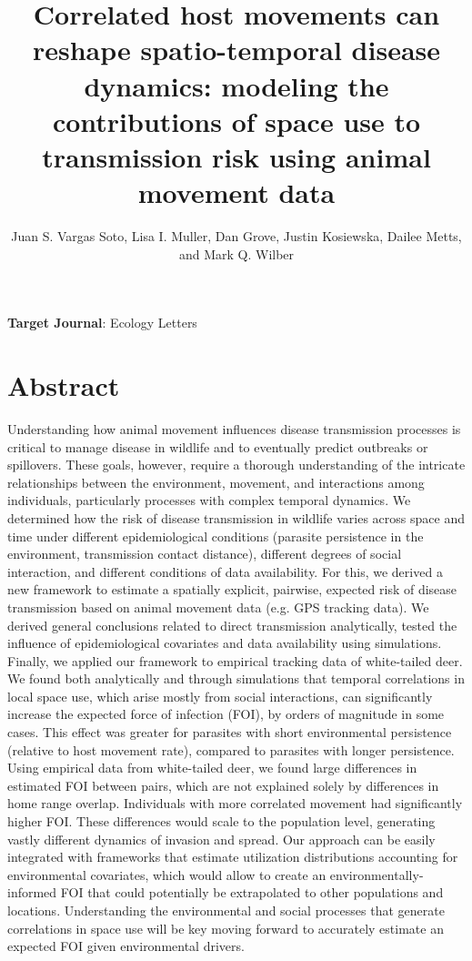 \documentclass[letterpaper]{article}
\title{Correlated host movements can reshape spatio-temporal disease dynamics: modeling the contributions of space use to transmission risk using animal movement data}
\author{Juan S. Vargas Soto, Lisa I. Muller, Dan Grove, Justin Kosiewska, Dailee Metts, and Mark Q. Wilber}
\affil{School of Natural Resources, University of Tennessee, Knoxville, TN}
\date{}
\begin{document}
\maketitle

\noindent
\textbf{Target Journal}: Ecology Letters

\section*{Abstract}

Understanding how animal movement influences disease transmission processes is critical to manage disease in wildlife and to eventually predict outbreaks or spillovers. These goals, however, require a thorough understanding of the intricate relationships between the environment, movement, and interactions among individuals, particularly processes with complex temporal dynamics.
We determined how the risk of disease transmission in wildlife varies across space and time under different epidemiological conditions (parasite persistence in the environment, transmission contact distance), different degrees of social interaction, and different conditions of data availability. For this, we derived a new framework to estimate a spatially explicit, pairwise, expected risk of disease transmission based on animal movement data (e.g. GPS tracking data). We derived general conclusions related to direct transmission analytically, tested the influence of epidemiological covariates and data availability using simulations. Finally, we applied our framework to empirical tracking data of white-tailed deer. 
We found both analytically and through simulations that temporal correlations in local space use, which arise mostly from social interactions, can significantly increase the expected force of infection (FOI), by orders of magnitude in some cases. This effect was greater for parasites with short environmental persistence (relative to host movement rate), compared to parasites with longer persistence.  
Using empirical data from white-tailed deer, we found large differences in estimated FOI between pairs, which are not explained solely by differences in home range overlap. Individuals with more correlated movement had significantly higher FOI. These differences would scale to the population level, generating vastly different dynamics of invasion and spread.
Our approach can be easily integrated with frameworks that estimate utilization distributions accounting for environmental covariates, which would allow to create an environmentally-informed FOI that could potentially be extrapolated to other populations and locations. Understanding the environmental and social processes that generate correlations in space use will be key moving forward to accurately estimate an expected FOI  given environmental drivers. 
\end{document}
